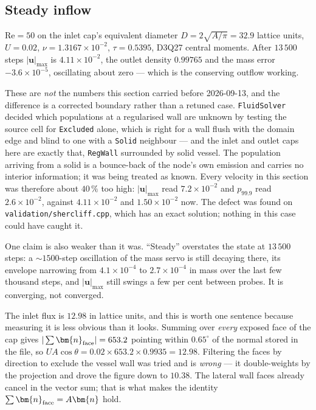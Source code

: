 \documentclass[11pt,a4paper]{article}
\newcommand{\code}[1]{\texttt{\small #1}}
\newcommand{\uu}{\bm{u}}
\newcommand{\nn}{\bm{n}}
\newcommand{\e}[1]{\times 10^{#1}}
\begin{document}
\subsection{Steady inflow}
\label{sec:aortasteady}

$\mathrm{Re}=50$ on the inlet cap's equivalent diameter $D = 2\sqrt{A/\pi} =
32.9$ lattice units, $U=0.02$, $\nu=1.3167\e{-2}$, $\tau=0.5395$, D3Q27 central
moments. After $13\,500$ steps $|\uu|_{\max}$ is $4.11\e{-2}$, the outlet
density $0.99765$ and the mass error $-3.6\e{-5}$, oscillating about zero ---
which is the conserving outflow working.

These are \emph{not} the numbers this section carried before 2026-09-13, and the
difference is a corrected boundary rather than a retuned case. \code{FluidSolver}
decided which populations at a regularised wall are unknown by testing the source
cell for \code{Excluded} alone, which is right for a wall flush with the domain
edge and blind to one with a \code{Solid} neighbour --- and the inlet and outlet
caps here are exactly that, \code{RegWall} surrounded by solid vessel. The
population arriving from a solid is a bounce-back of the node's own emission and
carries no interior information; it was being treated as known. Every velocity in
this section was therefore about $40\,\%$ too high: $|\uu|_{\max}$ read
$7.2\e{-2}$ and $p_{99.9}$ read $2.6\e{-2}$, against $4.11\e{-2}$ and
$1.50\e{-2}$ now. The defect was found on \code{validation/shercliff.cpp}, which
has an exact solution; nothing in this case could have caught it.

One claim is also weaker than it was. ``Steady'' overstates the state at
$13\,500$ steps: a ${\sim}1500$-step oscillation of the mass servo is still
decaying there, its envelope narrowing from $4.1\e{-4}$ to $2.7\e{-4}$ in mass
over the last few thousand steps, and $|\uu|_{\max}$ still swings a few per cent
between probes. It is converging, not converged.

The inlet flux is $12.98$ in lattice units, and this is worth one sentence
because measuring it is less obvious than it looks. Summing over \emph{every}
exposed face of the cap gives $|\sum \nn_{\rm face}| = 653.2$ pointing within
$0.65^\circ$ of the normal stored in the file, so $U A\cos\theta = 0.02 \times
653.2 \times 0.9935 = 12.98$. Filtering the faces by direction to exclude the
vessel wall was tried and is \emph{wrong} --- it double-weights by the projection
and drove the figure down to $10.38$. The lateral wall faces already cancel in
the vector sum; that is what makes the identity $\sum\nn_{\rm face} = A\nn$ hold.
\end{document}
